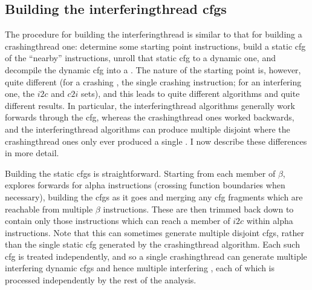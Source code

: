 \subsection[Building the \glsentrytext{interferingthread} \glsentrytext{cfg}s]{Building the \gls{interferingthread} \glspl{cfg}}

The procedure for building the \gls{interferingthread}
{\StateMachines} is similar to that for building a
\gls{crashingthread} one: determine some starting point instructions,
build a static \gls{cfg} of the ``nearby'' instructions, unroll that
static \gls{cfg} to a dynamic one, and decompile the dynamic \gls{cfg}
into a {\StateMachine}.  The nature of the starting point is, however,
quite different (for a crashing {\StateMachine}, the single crashing
instruction; for an interfering one, the $i2c$ and $c2i$ sets), and
this leads to quite different algorithms and quite different results.
In particular, the \gls{interferingthread} algorithms generally work
forwards through the \gls{cfg}, whereas the \gls{crashingthread} ones
worked backwards, and the \gls{interferingthread} algorithms can
produce multiple disjoint {\StateMachines} where the
\gls{crashingthread} ones only ever produced a single {\StateMachine}.
I now describe these differences in more detail.

Building the static \glspl{cfg} is straightforward.  Starting from
each member of $\beta$, {\technique} explores forwards for \gls{alpha}
instructions (crossing function boundaries when necessary), building
the \glspl{cfg} as it goes and merging any \gls{cfg} fragments which
are reachable from multiple $\beta$ instructions.  These are then
trimmed back down to contain only those instructions which can reach a
member of $i2c$ within \gls{alpha} instructions.  Note that this can sometimes
generate multiple disjoint \glspl{cfg}, rather than the single static
\gls{cfg} generated by the \gls{crashingthread} algorithm.  Each such
\gls{cfg} is treated independently, and so a single
\gls{crashingthread} can generate multiple interfering dynamic
\glspl{cfg} and hence multiple interfering {\StateMachines}, each of
which is processed independently by the rest of the analysis.

